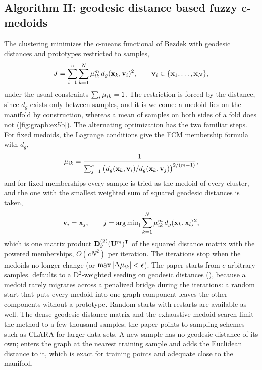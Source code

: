 \subsection{Algorithm II: geodesic distance based fuzzy c-medoids}\label{sec:graph:geofcm}

The clustering minimizes the c-means functional of Bezdek \cite{bezdek:1981} with geodesic distances and prototypes restricted to samples,
\begin{equation}
  J=\sum_{i=1}^{c}\sum_{k=1}^{N}\mu_{ik}^m\,d_g(\mathbf{x}_k,\mathbf{v}_i)^2,\qquad \mathbf{v}_i\in\{\mathbf{x}_1,\dots,\mathbf{x}_N\},
  \label{eq:graph:J}
\end{equation}
under the usual constraints $\sum_i\mu_{ik}=1$. The restriction is forced by the distance, since $d_g$ exists only between samples, and it is welcome: a medoid lies on the manifold by construction, whereas a mean of samples on both sides of a fold does not (\cref{fig:graph:ex5b}). The alternating optimization has the two familiar steps. For fixed medoids, the Lagrange conditions give the FCM membership formula with $d_g$,
\begin{equation}
  \mu_{ik}=\frac{1}{\sum_{j=1}^{c}\big(d_g(\mathbf{x}_k,\mathbf{v}_i)/d_g(\mathbf{x}_k,\mathbf{v}_j)\big)^{2/(m-1)}},
  \label{eq:graph:mu}
\end{equation}
and for fixed memberships every sample is tried as the medoid of every cluster, and the one with the smallest weighted sum of squared geodesic distances is taken,
\begin{equation}
  \mathbf{v}_i=\mathbf{x}_j,\qquad j=\operatorname{arg\,min}_{l}\sum_{k=1}^{N}\mu_{ik}^m\,d_g(\mathbf{x}_k,\mathbf{x}_l)^2 ,
  \label{eq:graph:medoid}
\end{equation}
which is one matrix product $\mathbf{D}_g^{(2)}(\mathbf{U}^{m})^{\mathsf{T}}$ of the squared distance matrix with the powered memberships, $O(cN^2)$ per iteration. The iterations stop when the medoids no longer change (or $\max|\Delta\mu_{ik}|<\epsilon$). The paper starts from $c$ arbitrary samples.  defaults to a D$^2$-weighted seeding on geodesic distances (), because a medoid rarely migrates across a penalized bridge during the iterations: a random start that puts every medoid into one graph component leaves the other components without a prototype. Random starts with restarts are available as well. The dense geodesic distance matrix and the exhaustive medoid search limit the method to a few thousand samples; the paper points to sampling schemes such as CLARA \cite{kaufman:1990:groups} for larger data sets. A new sample has no geodesic distance of its own;  enters the graph at the nearest training sample and adds the Euclidean distance to it, which is exact for training points and adequate close to the manifold.

